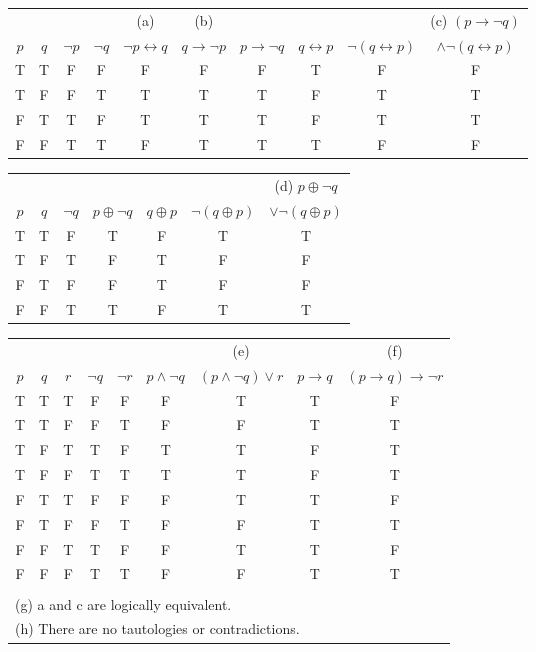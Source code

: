 \documentclass[12pt,addpoints]{exam}
\begin{document}
\begin{questions}
\begin{solution}
	\begin{tabular}{|cc|cc|c|c|ccc|c|}
	\hline
		& & & & (a) & (b) & & & & (c) $(p \rightarrow \neg q)$ \\
		$p$ & $q$ & $\neg p$ & $\neg q$ & $\neg p \leftrightarrow q$  & $q \rightarrow \neg p$
		    & $p \rightarrow \neg q$ & $q \leftrightarrow p$ & $\neg (q \leftrightarrow p)$ 
		    & $\wedge \neg (q \leftrightarrow p)$ \\
	\hline
		T & T & F & F & F & F & F & T & F & F \\
		T & F & F & T & T & T & T & F & T & T \\
		F & T & T & F & T & T & T & F & T & T \\   
		F & F & T & T & F & T & T & T & F & F \\
	\hline
	\end{tabular}
    
	\begin{tabular}{|cc|cccc|c|}
	\hline	
		& & & & & & (d) $p \oplus \neg q$  \\
		$p$ & $q$ & $\neg q$ & $p \oplus \neg q$ & $q \oplus p$ & $\neg(q \oplus p)$ & $\vee \neg (q \oplus p)$ \\
    \hline
    	T & T & F & T & F & T & T \\
    	T & F & T & F & T & F & F \\
    	F & T & F & F & T & F & F \\
    	F & F & T & T & F & T & T \\
    \hline
    \end{tabular}
    
    \begin{tabular}{|ccc|cc|cc|cc|}
    \hline
    	& & & & & & (e) & & (f) \\
    	$p$ & $q$ & $r$ & $\neg q$ & $\neg r$ & $p \wedge \neg q$ & $(p \wedge \neg q) \vee r$ 
    	  & $p \rightarrow q$ & $(p \rightarrow q) \rightarrow \neg r$ \\
    \hline
    	T & T & T & F & F & F & T & T & F \\
    	T & T & F & F & T & F & F & T & T \\
    	T & F & T & T & F & T & T & F & T \\
    	T & F & F & T & T & T & T & F & T \\
    	F & T & T & F & F & F & T & T & F \\
    	F & T & F & F & T & F & F & T & T \\	   
    	F & F & T & T & F & F & T & T & F \\
    	F & F & F & T & T & F & F & T & T \\
    	\multicolumn{9}{|c|}{} \\
     	\multicolumn{9}{|l|}{(g) a and c are logically equivalent.} \\
     	\multicolumn{9}{|l|}{(h) There are no tautologies or contradictions.} \\
    \hline
    \end{tabular}
   \end{solution}



\end{questions}
\end{document}
